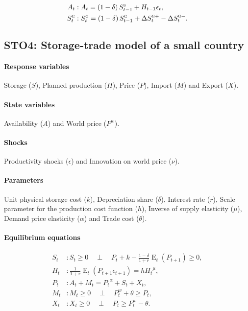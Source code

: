 \documentclass[11pt,fleqn]{article}
\DeclareMathOperator{\E}{E}
\newcommand{\Ss}{S^{\textsc{s}}}
\newcommand{\Sg}{S^{\textsc{g}}}
\newcommand{\Pw}{P^{w}}
\newcommand{\CP}{\quad \perp \quad}
\newcommand{\dSp}[1]{\Delta S^{\textsc{g}+}_{#1}}
\newcommand{\dSm}[1]{\Delta S^{\textsc{g}-}_{#1}}
\begin{document}
\begin{align}
  A_{t}&: A_{t}=\left(1-\delta\right)\Ss_{t-1}+H_{t-1}\epsilon_{t},\\
  \Sg_{t}&: \Sg_{t}= \left(1-\delta\right)\Sg_{t-1}+\dSp{t}-\dSm{t}.
\end{align}

\subsection{STO4: Storage-trade model of a small country}
\label{sec:storage-trade-model}


\paragraph{Response variables}

Storage ($S$), Planned production ($H$), Price ($P$), Import ($M$) and Export ($X$).

\paragraph{State variables}

Availability ($A$) and World price ($\Pw$).

\paragraph{Shocks}

Productivity shocks ($\epsilon$) and Innovation on world price ($\nu$).

\paragraph{Parameters}

Unit physical storage cost ($k$), Depreciation share ($\delta$), Interest rate
($r$), Scale parameter for the production cost function ($h$), Inverse of supply
elasticity ($\mu$), Demand price elasticity ($\alpha$) and Trade cost ($\theta$).

\paragraph{Equilibrium equations}

\begin{align}
  S_{t}&: S_{t}\ge 0 \CP P_{t}+k-\frac{1-\delta}{1+r}\E_{t}\left(P_{t+1}\right)\ge 0,\\
  H_{t}&: \frac{1}{1+r}\E_{t}\left(P_{t+1}\epsilon_{t+1}\right)=h {H_{t}}^{\mu},\\
  P_{t}&: A_{t}+M_{t}={P_{t}}^{\alpha}+S_{t}+X_{t},\\
  M_{t}&: M_{t}\ge 0 \CP \Pw_{t}+\theta\ge P_{t},\\
  X_{t}&: X_{t}\ge 0 \CP P_{t}\ge \Pw_{t}-\theta.
\end{align}
\end{document}
